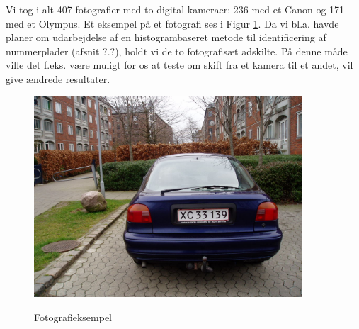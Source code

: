\documentclass[11pt,a4paper,final]{report}
\begin{document}
Vi tog i alt 407 fotografier med to digital kameraer: 236 med et Canon og 171 med et Olympus. Et eksempel på et fotografi ses i Figur \ref{b_xc33139}. Da vi bl.a. havde planer om udarbejdelse af en histogrambaseret metode til identificering af nummerplader (afsnit ?.?), holdt vi de to fotografisæt adskilte. På denne måde ville det f.eks. være muligt for os at teste om skift fra et kamera til et andet, vil give ændrede resultater.

\begin{figure}
\includegraphics[width=10cm]{illu/B_XC33139.jpg}
\label{b_xc33139}
\caption{Fotografieksempel}
\end{figure}


\newpage

\end{document}
